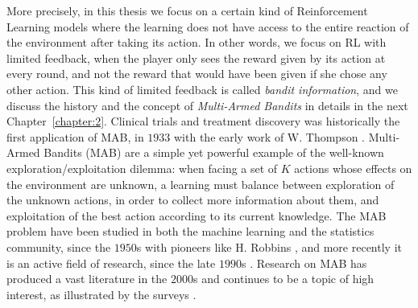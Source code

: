 More precisely, in this thesis we focus on a certain kind of Reinforcement Learning models where the learning does not have access to the entire reaction of the environment after taking its action.
In other words, we focus on RL with limited feedback, when the player only sees the reward given by its action at every round, and not the reward that would have been given if she chose any other action.
This kind of limited feedback is called \emph{bandit information}, and we discuss the history and the concept of \emph{Multi-Armed Bandits} in details in the next Chapter~\ref{chapter:2}.
Clinical trials and treatment discovery was historically the first application of MAB, in $1933$ with the early work of W. Thompson \cite{Thompson33}.
%
Multi-Armed Bandits (MAB) are a simple yet powerful example of the well-known exploration/exploitation dilemma:
when facing a set of $K$ actions whose effects on the environment are unknown, a learning must balance between
exploration of the unknown actions, in order to collect more information about them,
and exploitation of the best action according to its current knowledge.
%
The MAB problem have been studied in both the machine learning and the statistics community, since the $1950$s with pioneers like H. Robbins \cite{Robbins52}, and more recently it is an active field of research, since the late $1990$s \cite{Anantharam87a,Anantharam87b,auer1995gambling,Agrawal95}.
Research on MAB has produced a vast literature in the $2000$s \cite{Auer02,Auer02NonStochastic,Audibert2009minimax} and continues to be a topic of high interest, as illustrated by the surveys \cite{Bubeck12,LattimoreBanditAlgorithmsBook,Slivkins2019}.



